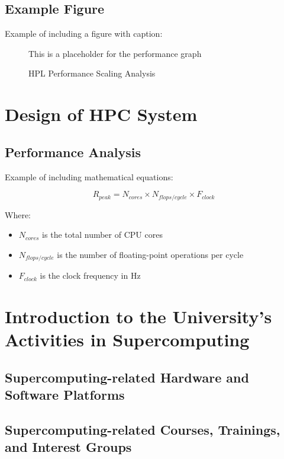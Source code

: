 \documentclass[a4paper,12pt]{article}
\begin{document}
\subsection{Example Figure}
Example of including a figure with caption:

\begin{figure}[H]
\centering
This is a placeholder for the performance graph
\caption{HPL Performance Scaling Analysis}
\label{fig:performance}
\end{figure}

\newpage

\section{Design of HPC System}

\subsection{Performance Analysis}
Example of including mathematical equations:

\begin{equation}
R_{peak} = N_{cores} \times N_{flops/cycle} \times F_{clock}
\end{equation}

Where:
\begin{itemize}
    \item $N_{cores}$ is the total number of CPU cores
    \item $N_{flops/cycle}$ is the number of floating-point operations per cycle
    \item $F_{clock}$ is the clock frequency in Hz
\end{itemize}

\newpage

\section{Introduction to the University's Activities in Supercomputing}

\subsection{Supercomputing-related Hardware and Software Platforms}

\subsection{Supercomputing-related Courses, Trainings, and Interest Groups}
\end{document}
